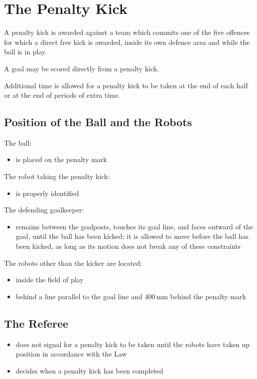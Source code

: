 \section{The Penalty Kick}\label{sec:penalty-kick}

A penalty kick is awarded against a team which commits one of the five offences for which a direct free kick is awarded, inside its own defence area and while the ball is in play.

A goal may be scored directly from a penalty kick.

Additional time is allowed for a penalty kick to be taken at the end of each half or at the end of periods of extra time.

\subsection{Position of the Ball and the Robots}
The ball:

\begin{itemize}
\item is placed on the penalty mark
\end{itemize}

The robot taking the penalty kick:

\begin{itemize}
\item is properly identified
\end{itemize}

The defending goalkeeper:

\begin{itemize}
\item remains between the goalposts, touches its goal line, and faces outward of the goal, until the ball has been kicked; it is allowed to move before the ball has been kicked, as long as its motion does not break any of these constraints
\end{itemize}

The robots other than the kicker are located:

\begin{itemize}
\item inside the field of play
\item behind a line parallel to the goal line and 400\,mm behind the penalty mark
\end{itemize}

\subsection{The Referee}
\begin{itemize}
\item does not signal for a penalty kick to be taken until the robots have taken up position in accordance with the Law
\item decides when a penalty kick has been completed
\end{itemize}


